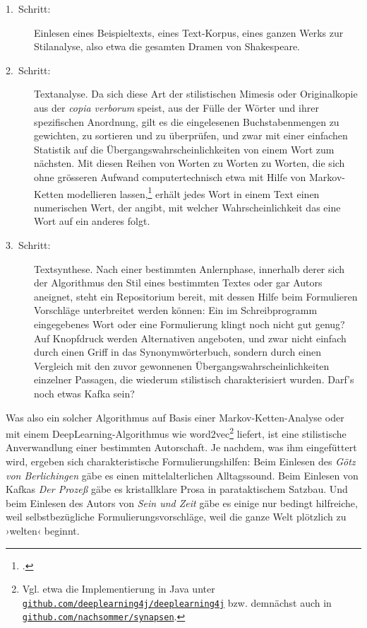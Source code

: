 \documentclass[a4paper,10pt]{article}
\newcommand{\inanf}[1]{›#1‹}
\newcommand{\ueber}[1]{{\color{crimson}[#1]}}
\begin{document}
\begin{description}
\item[1.~Schritt:] Einlesen eines Beispieltexts, eines Text-Korpus, eines ganzen Werks zur Stilanalyse, also etwa die gesamten Dramen von Shakespeare.
\item[2.~Schritt:] Textanalyse. Da sich diese Art der stilistischen Mimesis oder Originalkopie aus der \emph{copia verborum} speist, aus der Fülle der Wörter und ihrer spezifischen Anordnung, gilt es die eingelesenen Buchstabenmengen zu gewichten, zu sortieren und zu überprüfen, und zwar mit einer einfachen Statistik auf die Übergangswahrscheinlichkeiten von einem Wort zum nächsten. Mit diesen Reihen von Worten zu Worten zu Worten, die sich ohne grösseren Aufwand computertechnisch etwa mit Hilfe von Markov-Ketten modellieren lassen,\footcite[Zur Geschichte dieses Algorithmus vgl.][]{hilgers:2007} erhält jedes Wort in einem Text einen numerischen Wert, der angibt, mit welcher Wahrscheinlichkeit das eine Wort auf ein anderes folgt. 
%
\item[3.~Schritt:] Textsynthese. Nach einer bestimmten Anlernphase, innerhalb derer sich der Algorithmus den Stil eines bestimmten Textes oder gar Autors aneignet, steht ein Repositorium bereit, mit dessen Hilfe beim Formulieren Vorschläge unterbreitet werden können: Ein im Schreibprogramm eingegebenes Wort oder eine Formulierung klingt noch nicht gut genug? Auf Knopfdruck werden Alternativen angeboten, und zwar nicht einfach durch einen Griff in das Synonymwörterbuch, sondern durch einen Vergleich mit den zuvor gewonnenen Übergangswahrscheinlichkeiten einzelner Passagen, die wiederum stilistisch charakterisiert wurden. Darf's noch etwas Kafka sein? %
\end{description}
Was also ein solcher Algorithmus auf Basis einer Markov-Ketten-Analyse oder mit einem DeepLearning-Algorithmus wie word2vec\footnote{Vgl. etwa die Implementierung in Java unter \href{https://github.com/deeplearning4j/deeplearning4j}{\texttt{github.com/deeplearning4j/deeplearning4j}} bzw. demnächst auch in \href{https://github.com/nachsommer/synapsen}{\texttt{github.com/nachsommer/synapsen}}.} liefert, ist eine stilistische Anverwandlung einer bestimmten Autorschaft. Je nachdem, was ihm eingefüttert wird, ergeben sich charakteristische Formulierungshilfen: Beim Einlesen des \emph{Götz von Berlichingen} gäbe es einen mittelalterlichen Alltagssound. Beim Einlesen von Kafkas \emph{Der Prozeß} gäbe es kristallklare Prosa in parataktischem Satzbau. Und beim Einlesen des Autors von \emph{Sein und Zeit} gäbe es einige nur bedingt hilfreiche, weil selbstbezügliche Formulierungsvorschläge, weil die ganze Welt plötzlich zu \inanf{welten} beginnt.
\end{document}
